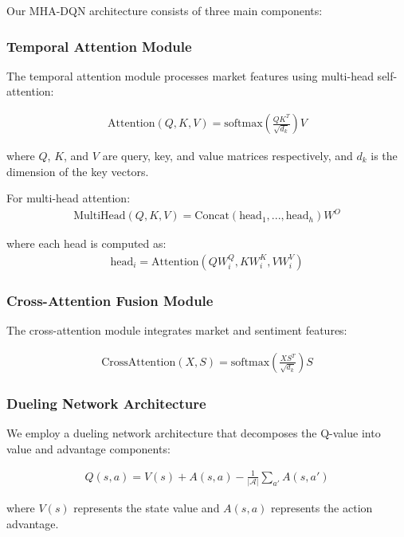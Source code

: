 \documentclass[11pt]{article}
\begin{document}
Our MHA-DQN architecture consists of three main components:

\subsubsection{Temporal Attention Module}

The temporal attention module processes market features using multi-head self-attention:

\begin{align}
    \text{Attention}(Q, K, V) = \text{softmax}\left(\frac{QK^T}{\sqrt{d_k}}\right)V
\end{align}

where $Q$, $K$, and $V$ are query, key, and value matrices respectively, and $d_k$ is the dimension of the key vectors.

For multi-head attention:
\begin{align}
    \text{MultiHead}(Q, K, V) = \text{Concat}(\text{head}_1, ..., \text{head}_h)W^O
\end{align}

where each head is computed as:
\begin{align}
    \text{head}_i = \text{Attention}(QW_i^Q, KW_i^K, VW_i^V)
\end{align}

\subsubsection{Cross-Attention Fusion Module}

The cross-attention module integrates market and sentiment features:

\begin{align}
    \text{CrossAttention}(X, S) = \text{softmax}\left(\frac{XS^T}{\sqrt{d_k}}\right)S
\end{align}

\subsubsection{Dueling Network Architecture}

We employ a dueling network architecture that decomposes the Q-value into value and advantage components:

\begin{align}
    Q(s, a) = V(s) + A(s, a) - \frac{1}{|\mathcal{A}|}\sum_{a'} A(s, a')
\end{align}

where $V(s)$ represents the state value and $A(s, a)$ represents the action advantage.
\end{document}
